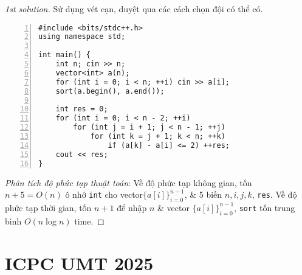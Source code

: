 \documentclass{article}
\begin{document}
\begin{proof}[1st solution]
    Sử dụng vét cạn, duyệt qua các cách chọn đội có thể có.
    \begin{Verbatim}[numbers=left,xleftmargin=5mm]
#include <bits/stdc++.h>
using namespace std;

int main() {
    int n; cin >> n;
    vector<int> a(n);
    for (int i = 0; i < n; ++i) cin >> a[i];
    sort(a.begin(), a.end());
    
    int res = 0;
    for (int i = 0; i < n - 2; ++i)
        for (int j = i + 1; j < n - 1; ++j)
            for (int k = j + 1; k < n; ++k)
                if (a[k] - a[i] <= 2) ++res;
    cout << res;
}
    \end{Verbatim}
     {\it Phân tích độ phức tạp thuật toán}: Về độ phức tạp không gian, tốn $n + 5 = O(n)$ ô nhớ {\tt int} cho vector$\{a[i]\}_{i=0}^{n-1}$, \& 5 biến $n,i,j,k$, {\tt res}. Về độ phức tạp thời gian, tốn $n + 1$ để nhập $n$ \& vector $\{a[i]\}_{i=0}^{n-1}$, {\tt sort} tốn trung bình $O(n\log n)$ time.
\end{proof}


 \section{ICPC UMT 2025}
 
\end{document}
